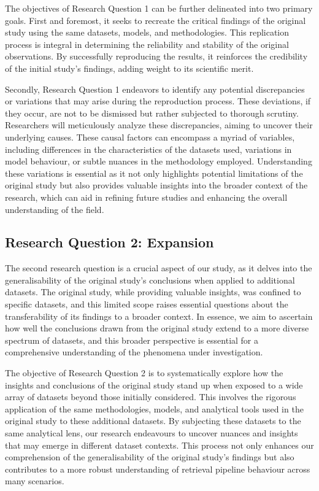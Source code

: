 The objectives of Research Question 1 can be further delineated into two primary goals. First and foremost, it seeks to recreate the critical findings of the original study using the same datasets, models, and methodologies. This replication process is integral in determining the reliability and stability of the original observations. By successfully reproducing the results, it reinforces the credibility of the initial study's findings, adding weight to its scientific merit.

Secondly, Research Question 1 endeavors to identify any potential discrepancies or variations that may arise during the reproduction process. These deviations, if they occur, are not to be dismissed but rather subjected to thorough scrutiny. Researchers will meticulously analyze these discrepancies, aiming to uncover their underlying causes. These causal factors can encompass a myriad of variables, including differences in the characteristics of the datasets used, variations in model behaviour, or subtle nuances in the methodology employed. Understanding these variations is essential as it not only highlights potential limitations of the original study but also provides valuable insights into the broader context of the research, which can aid in refining future studies and enhancing the overall understanding of the field.

\subsection{Research Question 2: Expansion}
The second research question is a crucial aspect of our study, as it delves into the generalisability of the original study's conclusions when applied to additional datasets. The original study, while providing valuable insights, was confined to specific datasets, and this limited scope raises essential questions about the transferability of its findings to a broader context. In essence, we aim to ascertain how well the conclusions drawn from the original study extend to a more diverse spectrum of datasets, and this broader perspective is essential for a comprehensive understanding of the phenomena under investigation.

The objective of Research Question 2 is to systematically explore how the insights and conclusions of the original study stand up when exposed to a wide array of datasets beyond those initially considered. This involves the rigorous application of the same methodologies, models, and analytical tools used in the original study to these additional datasets. By subjecting these datasets to the same analytical lens, our research endeavours to uncover nuances and insights that may emerge in different dataset contexts. This process not only enhances our comprehension of the generalisability of the original study's findings but also contributes to a more robust understanding of retrieval pipeline behaviour across many scenarios.

